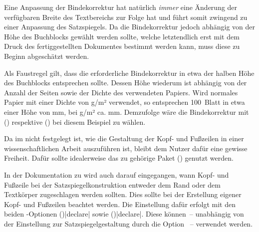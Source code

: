 \begin{Declaration*}{}
\begin{Declaration*}{}
\begin{Declaration*}{}
Eine Anpassung der Bindekorrektur hat natürlich \emph{immer} eine Änderung der 
verfügbaren Breite des Textbereichs zur Folge hat und führt somit zwingend zu 
einer Anpassung des Satzspiegels. Da die Bindekorrektur jedoch abhängig von der 
Höhe des Buchblocks gewählt werden sollte, welche letztendlich erst mit dem 
Druck des fertiggestellten Dokumentes bestimmt werden kann, muss diese zu 
Beginn abgeschätzt werden.
%
\begin{Example}
Als Faustregel gilt, dass die erforderliche Bindekorrektur in etwa der halben 
Höhe des Buchblocks entsprechen sollte. Dessen Höhe wiederum ist abhängig von 
der Anzahl der Seiten sowie der Dichte des verwendeten Papiers. Wird normales 
Papier mit einer Dichte von \unit[80]{g/m²} verwendet, so entsprechen 100~Blatt 
in etwa einer Höhe von \unit[10]{mm}, bei \unit[100]{g/m²} ca. \unit[12]{mm}. 
Demzufolge wäre die Bindekorrektur mit () 
respektive () bei diesem Beispiel zu wählen.
%
\end{Example}

%
%
%
Da im \CD nicht festgelegt ist, wie die Gestaltung der Kopf- und Fußzeilen in 
einer wissenschaftlichen Arbeit auszuführen ist, bleibt dem Nutzer dafür eine 
gewisse Freiheit. Dafür sollte idealerweise das zu \KOMAScript{} gehörige Paket 
() genutzt werden. 

In der Dokumentation zu  wird auch darauf eingegangen, wann 
Kopf- und Fußzeile bei der Satzspiegelkonstruktion entweder dem Rand oder dem 
Textkörper zugeschlagen werden sollten. Dies sollte bei der Erstellung eigener 
Kopf- und Fußzeilen beachtet werden. Die Einstellung dafür erfolgt mit den 
beiden \KOMAScript-Optionen 
()|declare| sowie 
()|declare|.
Diese können~-- unabhängig von der Einstellung zur Satzspiegelgestaltung durch 
die Option ~-- verwendet werden.



\end{Declaration*}
\end{Declaration*}
\end{Declaration*}
